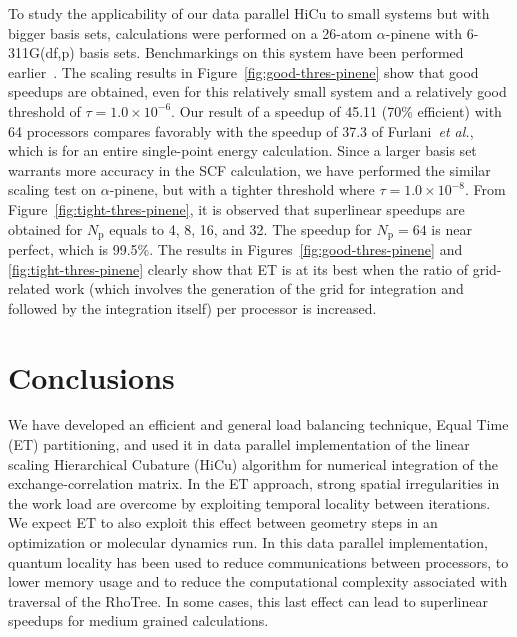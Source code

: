\commentoutA{\documentclass[prl,aps,twocolumn,showpacs,twocolumngrid,superbib]{revtex4}}
\newcommand{\Np}{N_{\mathrm{p}}} \newcommand{\Nbox}{N_{\mathrm{b}}}
\begin{document}
To study the applicability of our data parallel HiCu to small systems but
with bigger basis sets, calculations were performed on a 26-atom
$\alpha$-pinene with 6-311G(df,p) basis sets. Benchmarkings on this system
have been performed earlier~\cite{Furlani_00v128,Sosa_00v26}.
The scaling results in Figure~\ref{fig:good-thres-pinene}
show that good speedups are obtained, even for this relatively small
system and a relatively good threshold of $\tau = 1.0 \times 10^{-6}$.
Our result of a speedup of 45.11 (70\% efficient)
with 64 processors compares
favorably with the speedup of 37.3 of
Furlani~{\it et al.}\cite{Furlani_00v128}, which is for an entire single-point
energy calculation. Since a larger basis set warrants more accuracy in the SCF
calculation, we have performed the similar scaling test on $\alpha$-pinene,
but with a tighter threshold where $\tau = 1.0 \times 10^{-8}$.
From Figure~\ref{fig:tight-thres-pinene}, it is observed that
superlinear speedups are obtained for $\Np$
equals to 4, 8, 16, and 32. The speedup for $\Np = 64$ is near perfect, which
is 99.5\%. 
The results in Figures~\ref{fig:good-thres-pinene} and \ref{fig:tight-thres-pinene} clearly show that ET is at its best when the ratio of grid-related work (which involves the generation of the grid
for integration and followed by the integration itself) per processor is 
increased.
\section{Conclusions}
\label{sec:conclusions}

We have developed an efficient and general load balancing technique,
Equal Time (ET) partitioning, and used it in data parallel
implementation of the linear scaling Hierarchical Cubature (HiCu)
algorithm for numerical integration of the exchange-correlation
matrix.  In the ET approach, strong spatial irregularities in the work
load are overcome by exploiting temporal locality between iterations.
We expect ET to also exploit this effect between geometry steps in an
optimization or molecular dynamics run.  In this data parallel
implementation, quantum locality has been used to reduce
communications between processors, to lower memory usage and to reduce
the computational complexity associated with traversal of the RhoTree.
In some cases, this last effect can lead to superlinear speedups for
medium grained calculations.
\end{document}
